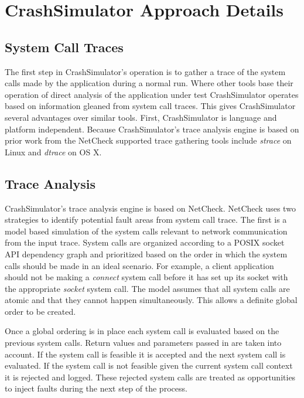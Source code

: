 \section{CrashSimulator Approach Details}

    \subsection{System Call Traces}

    The first step in CrashSimulator's operation is to gather a trace of the system
    calls made by the application during a normal run. Where other tools base their operation of direct analysis of the
    application under test CrashSimulator operates based on information gleaned from system call traces. This gives
    CrashSimulator several advantages over similar tools. First, CrashSimulator is language and platform independent.
    Because CrashSimulator's trace analysis engine is based on prior work from the NetCheck supported trace gathering
    tools include \emph{strace} on Linux and \emph{dtrace} on OS X.

    \subsection{Trace Analysis}

    CrashSimulator's trace analysis engine is based on NetCheck. NetCheck uses two strategies
    to identify potential fault areas from system call trace. The first is a model based simulation of the system calls
    relevant to network communication from the input trace. System calls are organized according to a POSIX socket API
    dependency graph and prioritized based on the order in which the system calls should be made in an ideal scenario.
    For example, a client application should not be making a \emph{connect} system call before it has set up its
    socket with the appropriate \emph{socket} system call. The model assumes that all system calls are atomic and that
    they cannot happen simultaneously. This allows a definite global order to be created.

    Once a global ordering is in place each system call is evaluated based on the previous system calls. Return values
    and parameters passed in are taken into account. If the system call is feasible it is accepted and the next system
    call is evaluated. If the system call is not feasible given the current system call context it is rejected and
    logged. These rejected system calls are treated as opportunities to inject faults during the next step of the
    process.

